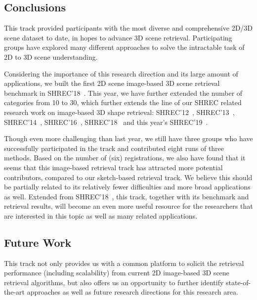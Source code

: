 \documentclass[../main.tex]{subfiles}
\begin{document}
\subsection{Conclusions}
This track provided participants with the most diverse and comprehensive 2D/3D scene dataset to date, in hopes to advance 3D scene retrieval. Participating groups have explored many different approaches to solve the intractable task of 2D to 3D scene understanding.

Considering the importance of this research direction and its large amount of 
applications, we built the first 2D scene image-based 3D scene retrieval 
benchmark in SHREC'18~\cite{SceneIBR18Journal}. This year, we have further 
extended the number of categories from 10 to 30, which further extends the line 
of our SHREC related research work on image-based 3D shape retrieval: 
SHREC'12~\cite{DBLP:conf/3dor/LiSGABBCEFHHJKORSSYYY12, 
DBLP:journals/cviu/0013LGSBFFFJMOPS14}, 
SHREC'13~\cite{DBLP:conf/3dor/LiLGSAJST13, 
DBLP:journals/cviu/0013LGSBFFFJMOPS14}, 
SHREC'14~\cite{DBLP:conf/3dor/LiLLGSABFFJLOTZ14, 
DBLP:journals/cviu/LiLLGSABCCFFFLLJKKOTWZZ15}, 
SHREC'16~\cite{DBLP:conf/3dor/0013LDDFQLLLLOT16}, 
SHREC'18~\cite{SHREC18-SceneIBR-Track} and this year's 
SHREC'19~\cite{SceneIBR19}.

Though even more challenging than last year, we still have three groups who 
have successfully participated in the track and contributed eight runs of three 
methods. Based on the number of (six) registrations, we also have found that it 
seems that this image-based retrieval track has attracted more potential 
contributors, compared to our sketch-based retrieval track. We believe this 
should be partially related to its relatively fewer difficulties and more broad 
applications as well. Extended from SHREC'18~\cite{SHREC18-SceneIBR-Track}, 
this track, together with its benchmark and retrieval results, will become an 
even more useful resource for the researchers that are interested in this topic 
as well as many related applications.


\subsection{Future Work}
This track not only provides us with a common platform to solicit the retrieval performance (including scalability) from current 2D image-based 3D scene retrieval algorithms, but also offers us an opportunity to further identify state-of-the-art approaches as well as future research directions for this research area.
\end{document}
